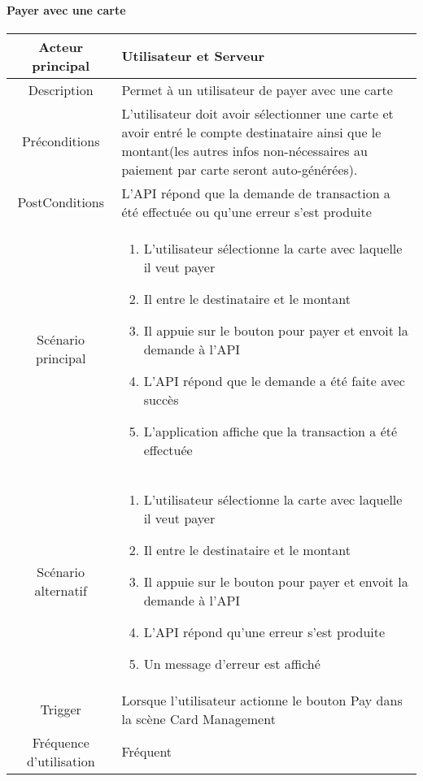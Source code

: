 \documentclass{article}
\begin{document}
\paragraph{Payer avec une carte}
    \begin{table}[h]
        \begin{tabular}{|c|p{10cm}|}
        \hline
        Acteur principal& Utilisateur et Serveur    \\
        \hline
        Description&  Permet à un utilisateur de payer avec une carte  \\
        \hline
        Préconditions&   L'utilisateur doit avoir sélectionner une carte et avoir entré
             le compte destinataire ainsi que le montant(les autres infos non-nécessaires
             au paiement par carte seront auto-générées). \\
        \hline
        PostConditions&  L'API répond que la demande de transaction a été effectuée ou qu'une erreur s'est produite    \\
        \hline
        Scénario principal& 
                \begin{enumerate}
                    \item L'utilisateur sélectionne la carte avec laquelle il veut payer
                    \item Il entre le destinataire et le montant
                    \item Il appuie sur le bouton pour payer et envoit la demande à l'API
                    \item L'API répond que le demande a été faite avec succès
                    \item L'application affiche que la transaction a été effectuée
                \end{enumerate}     \\
        \hline
        Scénario alternatif&  
        \begin{enumerate}
            \item L'utilisateur sélectionne la carte avec laquelle il veut payer
            \item Il entre le destinataire et le montant
            \item Il appuie sur le bouton pour payer et envoit la demande à l'API
            \item L'API répond qu'une erreur s'est produite
            \item Un message d'erreur est affiché
        \end{enumerate}    \\
        \hline
        Trigger&   Lorsque l'utilisateur actionne le bouton Pay dans la scène Card Management   \\
        \hline
        Fréquence d'utilisation&   Fréquent  \\
        \hline
        \end{tabular}
    \end{table}
\end{document}
